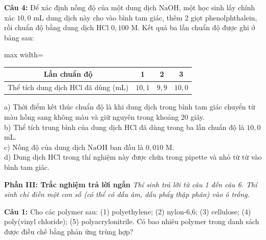 \documentclass[12pt,a4paper]{article}
\begin{document}
\par\noindent\begin{minipage}{\linewidth}
\noindent \textbf{Câu 4:} Để xác định nồng độ của một dung dịch $\text{NaOH}$, một học sinh lấy chính xác $10{,}0$ mL dung dịch này cho vào bình tam giác, thêm 2 giọt phenolphthalein, rồi chuẩn độ bằng dung dịch $\text{HCl}$ $0{,}100$ M. Kết quả ba lần chuẩn độ được ghi ở bảng sau:\\
\begin{center}
\begin{adjustbox}{max width=\linewidth}
\begin{tabular}{|c|c|c|c|}
\hline
Lần chuẩn độ & 1 & 2 & 3 \\
\hline
Thể tích dung dịch $\text{HCl}$ đã dùng (mL) & $10{,}1$ & $9{,}9$ & $10{,}0$ \\
\hline
\end{tabular}
\end{adjustbox}
\end{center}
\noindent a) Thời điểm kết thúc chuẩn độ là khi dung dịch trong bình tam giác chuyển từ màu hồng sang không màu và giữ nguyên trong khoảng 20 giây.\\

\noindent b) Thể tích trung bình của dung dịch $\text{HCl}$ đã dùng trong ba lần chuẩn độ là $10{,}0$ mL.\\

\noindent c) Nồng độ của dung dịch $\text{NaOH}$ ban đầu là $0{,}010$ M.\\

\noindent d) Dung dịch $\text{HCl}$ trong thí nghiệm này được chứa trong pipette và nhỏ từ từ vào bình tam giác.\\

\vspace{0.5cm}
\end{minipage}\par\vspace{0.12cm}
\textbf{Phần III: Trắc nghiệm trả lời ngắn} \textit{Thí sinh trả lời từ câu 1 đến câu 6. Thí sinh chỉ điền một con số (có thể có dấu âm, dấu phẩy thập phân) vào ô trống.}


\par\noindent\begin{minipage}{\linewidth}
\noindent \textbf{Câu 1:} Cho các polymer sau: (1) polyethylene; (2) nylon-6,6; (3) cellulose; (4) poly(vinyl chloride); (5) polyacrylonitrile. Có bao nhiêu polymer trong danh sách được điều chế bằng phản ứng trùng hợp?\\
\end{minipage}\par\vspace{0.12cm}
\end{document}
